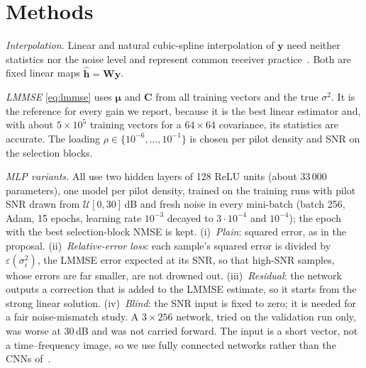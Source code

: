 \documentclass[conference]{IEEEtran}
\newcommand{\hh}{\hat{\bm{h}}}
\newcommand{\vy}{\bm{y}}
\newcommand{\vmu}{\bm{\mu}}
\newcommand{\mC}{\bm{C}}
\begin{document}
\section{Methods}
\label{sec:methods}
\emph{Interpolation.} Linear and natural cubic-spline interpolation of $\vy$ need neither statistics nor
the noise level and represent common receiver practice~\cite{coleri2002}. Both are fixed linear maps
$\hh=\bm{W}\vy$.

\emph{LMMSE} \eqref{eq:lmmse} uses $\vmu$ and $\mC$ from all training vectors and the true $\sigma^2$. It is
the reference for every gain we report, because it is the best linear estimator and, with about
$5\times10^5$ training vectors for a $64\times64$ covariance, its statistics are accurate. The loading
$\rho\in\{10^{-6},\dots,10^{-1}\}$ is chosen per pilot density and SNR on the selection blocks.

\emph{MLP variants.} All use two hidden layers of 128 ReLU units (about 33\,000 parameters), one model per
pilot density, trained on the training runs with pilot SNR drawn from $\mathcal{U}[0,30]$\,dB and fresh
noise in every mini-batch (batch 256, Adam, 15 epochs, learning rate $10^{-3}$ decayed to $3\cdot10^{-4}$
and $10^{-4}$); the epoch with the best selection-block NMSE is kept. (i)~\emph{Plain}: squared error, as
in the proposal. (ii)~\emph{Relative-error loss}: each sample's squared error is divided by
$\varepsilon(\sigma_i^2)$, the LMMSE error expected at its SNR, so that high-SNR samples, whose errors are
far smaller, are not drowned out. (iii)~\emph{Residual}: the network outputs a correction that is added to
the LMMSE estimate, so it starts from the strong linear solution. (iv)~\emph{Blind}: the SNR input is
fixed to zero; it is needed for a fair noise-mismatch study. A $3\times256$ network, tried on the validation run only, was worse at 30\,dB and was not carried forward. The input is a short vector, not a time--frequency image, so we use fully
connected networks rather than the CNNs of~\cite{soltani2019,li2020}.
\end{document}
